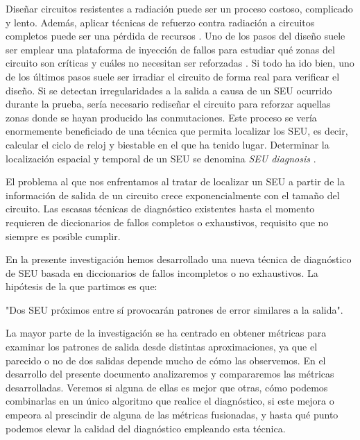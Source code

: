 Diseñar circuitos resistentes a radiación puede ser un proceso costoso, complicado
y lento. Además, aplicar técnicas de refuerzo contra radiación a circuitos 
completos puede ser una pérdida de recursos \cite{SelectiveHardening}. Uno de los
pasos del diseño suele ser emplear una plataforma de inyección de fallos para
estudiar qué zonas del circuito son críticas y cuáles no necesitan ser reforzadas 
\cite{SelectiveHardening}. Si todo ha ido bien, uno de los últimos pasos suele ser
irradiar el circuito de forma real para verificar el diseño. Si se detectan 
irregularidades a la salida a causa de un \gls{SEU} ocurrido durante la prueba,
sería necesario rediseñar el circuito para reforzar aquellas zonas donde se hayan producido las conmutaciones.
Este proceso se vería enormemente beneficiado de una técnica que permita localizar
los \gls{SEU}, es decir, calcular el ciclo de reloj y biestable en el que ha
tenido lugar. Determinar la localización espacial y temporal de un \gls{SEU} se
denomina \textit{\gls{SEU} diagnosis} \cite{SEUDiagnosis}.

El problema al que nos enfrentamos al tratar de localizar un \gls{SEU} a partir de
la información de salida de un circuito crece exponencialmente con el tamaño del
circuito. Las escasas técnicas de diagnóstico  existentes hasta el momento 
requieren de diccionarios de fallos completos o exhaustivos, requisito que no
siempre es posible cumplir.

En la presente investigación hemos desarrollado una nueva técnica de diagnóstico
de \gls{SEU} basada en diccionarios de fallos incompletos o no exhaustivos. La
hipótesis de la que partimos es que: 

\begin{hypothesis}\label{hyp:inicial}
    "Dos \gls{SEU} próximos entre sí provocarán patrones de error similares a la 
    salida".
\end{hypothesis}

La mayor parte de la investigación se ha centrado en obtener métricas para 
examinar los patrones de salida desde distintas aproximaciones, ya que el parecido
o no de dos salidas depende mucho de cómo las observemos. En el desarrollo del
presente documento analizaremos y compararemos las métricas desarrolladas. Veremos
si alguna de ellas es mejor que otras, cómo podemos combinarlas en un único
algoritmo que realice el diagnóstico, si este mejora o empeora al prescindir
de alguna de las métricas fusionadas, y hasta qué punto podemos elevar la calidad
del diagnóstico empleando esta técnica.

\endinput
